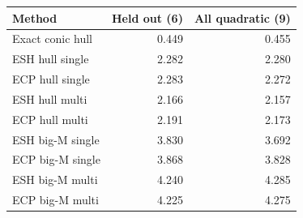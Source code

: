 \begin{tabular}{lrr}
\toprule
Method & Held out (6) & All quadratic (9) \\
\midrule
Exact conic hull & 0.449 & 0.455 \\
ESH hull single & 2.282 & 2.280 \\
ECP hull single & 2.283 & 2.272 \\
ESH hull multi & 2.166 & 2.157 \\
ECP hull multi & 2.191 & 2.173 \\
ESH big-M single & 3.830 & 3.692 \\
ECP big-M single & 3.868 & 3.828 \\
ESH big-M multi & 4.240 & 4.285 \\
ECP big-M multi & 4.225 & 4.275 \\
\bottomrule
\end{tabular}
